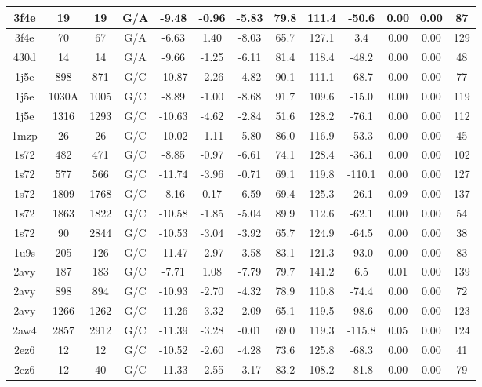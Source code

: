 {\begin{center}
\begin{longtable}{|c|c|c|c|c|c|c|c|c|c|c|c|c|}
3f4e & 19 & 19 & G/A & -9.48 & -0.96 & -5.83 & 79.8 & 111.4 & -50.6 & 0.00 & 0.00 & 87 \\ \hline
3f4e & 70 & 67 & G/A & -6.63 & 1.40 & -8.03 & 65.7 & 127.1 & 3.4 & 0.00 & 0.00 & 129 \\ \hline
430d & 14 & 14 & G/A & -9.66 & -1.25 & -6.11 & 81.4 & 118.4 & -48.2 & 0.00 & 0.00 & 48 \\ \hline
1j5e & 898 & 871 & G/C & -10.87 & -2.26 & -4.82 & 90.1 & 111.1 & -68.7 & 0.00 & 0.00 & 77 \\ \hline
1j5e & 1030A & 1005 & G/C & -8.89 & -1.00 & -8.68 & 91.7 & 109.6 & -15.0 & 0.00 & 0.00 & 119 \\ \hline
1j5e & 1316 & 1293 & G/C & -10.63 & -4.62 & -2.84 & 51.6 & 128.2 & -76.1 & 0.00 & 0.00 & 112 \\ \hline
1mzp & 26 & 26 & G/C & -10.02 & -1.11 & -5.80 & 86.0 & 116.9 & -53.3 & 0.00 & 0.00 & 45 \\ \hline
1s72 & 482 & 471 & G/C & -8.85 & -0.97 & -6.61 & 74.1 & 128.4 & -36.1 & 0.00 & 0.00 & 102 \\ \hline
1s72 & 577 & 566 & G/C & -11.74 & -3.96 & -0.71 & 69.1 & 119.8 & -110.1 & 0.00 & 0.00 & 127 \\ \hline
1s72 & 1809 & 1768 & G/C & -8.16 & 0.17 & -6.59 & 69.4 & 125.3 & -26.1 & 0.09 & 0.00 & 137 \\ \hline
1s72 & 1863 & 1822 & G/C & -10.58 & -1.85 & -5.04 & 89.9 & 112.6 & -62.1 & 0.00 & 0.00 & 54 \\ \hline
1s72 & 90 & 2844 & G/C & -10.53 & -3.04 & -3.92 & 65.7 & 124.9 & -64.5 & 0.00 & 0.00 & 38 \\ \hline
1u9s & 205 & 126 & G/C & -11.47 & -2.97 & -3.58 & 83.1 & 121.3 & -93.0 & 0.00 & 0.00 & 83 \\ \hline
2avy & 187 & 183 & G/C & -7.71 & 1.08 & -7.79 & 79.7 & 141.2 & 6.5 & 0.01 & 0.00 & 139 \\ \hline
2avy & 898 & 894 & G/C & -10.93 & -2.70 & -4.32 & 78.9 & 110.8 & -74.4 & 0.00 & 0.00 & 72 \\ \hline
2avy & 1266 & 1262 & G/C & -11.26 & -3.32 & -2.09 & 65.1 & 119.5 & -98.6 & 0.00 & 0.00 & 123 \\ \hline
2aw4 & 2857 & 2912 & G/C & -11.39 & -3.28 & -0.01 & 69.0 & 119.3 & -115.8 & 0.05 & 0.00 & 124 \\ \hline
2ez6 & 12 & 12 & G/C & -10.52 & -2.60 & -4.28 & 73.6 & 125.8 & -68.3 & 0.00 & 0.00 & 41 \\ \hline
2ez6 & 12 & 40 & G/C & -11.33 & -2.55 & -3.17 & 83.2 & 108.2 & -81.8 & 0.00 & 0.00 & 79 \\ \hline

\end{longtable}
\end{center}}
